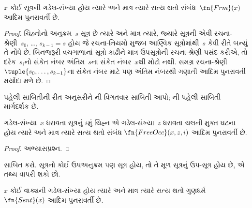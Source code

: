 \begin{prop}
$x$ કોઈ સૂત્રની ગડેલ-સંખ્યા
હોય ત્યારે અને માત્ર ત્યારે સત્ય થતો
સંબંધ~$\fn{Frm}(x)$ આદિમ પુનરાવર્તી છે.
\end{prop}

\begin{proof}
ચિહ્નોનો અનુક્રમ~$s$ સૂત્ર છે
ત્યારે અને માત્ર ત્યારે, જ્યારે
સૂત્રની એવી રચના-શ્રેણી~$s_0$,
\dots, $s_{k-1} = s$ હોય જે રચના-નિયમો
મુજબ આણ્વિક સૂત્રોમાંથી~$s$
કેવી રીતે બન્યું તે નોંધે છે. બિનજરૂરી
વચગાળાનાં સૂત્રો કાઢીને માત્ર ઉપસૂત્રોની
રચના-શ્રેણી પસંદ કરીએ, તો દરેક~$s_i$નો
સંકેત નંબર અંતિમ~$s$ના સંકેત નંબર~$x$થી
મોટો નથી. સમગ્ર રચના-શ્રેણી
$\tuple{s_0, \dots, s_{k-1}}$ના સંકેત
નંબર માટે પણ અંતિમ નંબરથી ગણાતી
આદિમ પુનરાવર્તી મર્યાદા મળે છે.
\end{proof}

\begin{prob}
પહેલી સાબિતીની રીત અનુસરીને
ની
વિગતવાર સાબિતી આપો;
ની
પહેલી સાબિતી માર્ગદર્શક છે.
\end{prob}

\begin{prop}
ગડેલ-સંખ્યા~$x$ ધરાવતા સૂત્રનું
$i$મું ચિહ્ન એ ગડેલ-સંખ્યા~$z$
ધરાવતા ચલની મુક્ત ઘટના હોય ત્યારે
અને માત્ર ત્યારે સત્ય થતો સંબંધ
$\fn{FreeOcc}(x, z, i)$ આદિમ
પુનરાવર્તી છે.
\end{prop}

\begin{proof}
અભ્યાસપ્રશ્ન.
\end{proof}

\begin{prob}
સાબિત કરો. સૂત્રનો કોઈ
ઉપઅનુક્રમ પણ સૂત્ર હોય, તો
તે મૂળ સૂત્રનું ઉપ-સૂત્ર હોય છે,
એ તથ્ય વાપરી શકો છો.
\end{prob}

\begin{prop}
$x$ કોઈ વાક્યની ગડેલ-સંખ્યા
હોય ત્યારે અને માત્ર ત્યારે સત્ય થતો
ગુણધર્મ~$\fn{Sent}(x)$ આદિમ
પુનરાવર્તી છે.
\end{prop}

